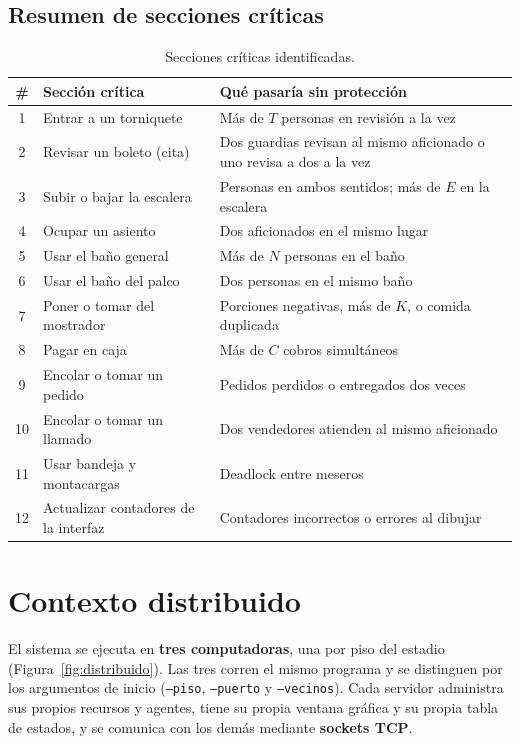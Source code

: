 \documentclass[11pt,letterpaper]{article}
\newcommand{\code}[1]{\texttt{#1}}
\begin{document}
\subsection{Resumen de secciones críticas}
\begin{table}[H]
\centering
\small
\begin{tabularx}{\linewidth}{c l L}
\toprule
\# & Sección crítica & Qué pasaría sin protección \\
 & Entrar a un torniquete & Más de $T$ personas en revisión a la vez \\
2 & Revisar un boleto (cita) & Dos guardias revisan al mismo aficionado o uno revisa a dos a la vez \\
3 & Subir o bajar la escalera & Personas en ambos sentidos; más de $E$ en la escalera \\
4 & Ocupar un asiento & Dos aficionados en el mismo lugar \\
5 & Usar el baño general & Más de $N$ personas en el baño \\
6 & Usar el baño del palco & Dos personas en el mismo baño \\
7 & Poner o tomar del mostrador & Porciones negativas, más de $K$, o comida duplicada \\
8 & Pagar en caja & Más de $C$ cobros simultáneos \\
9 & Encolar o tomar un pedido & Pedidos perdidos o entregados dos veces \\
10 & Encolar o tomar un llamado & Dos vendedores atienden al mismo aficionado \\
11 & Usar bandeja y montacargas & Deadlock entre meseros \\
12 & Actualizar contadores de la interfaz & Contadores incorrectos o errores al dibujar \\
\bottomrule
\end{tabularx}
\caption{Secciones críticas identificadas.}
\end{table}

\section{Contexto distribuido}

El sistema se ejecuta en \textbf{tres computadoras}, una por piso del estadio (Figura~\ref{fig:distribuido}). Las tres corren el mismo programa y se distinguen por los argumentos de inicio (\code{--piso}, \code{--puerto} y \code{--vecinos}). Cada servidor administra sus propios recursos y agentes, tiene su propia ventana gráfica y su propia tabla de estados, y se comunica con los demás mediante \textbf{sockets TCP}.
\end{document}
